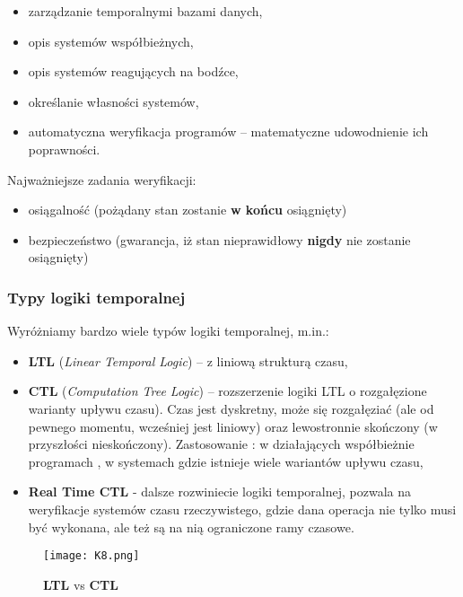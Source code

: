 \begin{itemize}
	\item zarządzanie temporalnymi bazami danych,
	\item opis systemów współbieżnych,
	\item opis systemów reagujących na bodźce,
	\item określanie własności systemów,
	\item automatyczna weryfikacja programów – matematyczne udowodnienie ich poprawności. \\
\end{itemize}

Najważniejsze zadania weryfikacji:

\begin{itemize}
	\item osiągalność (pożądany stan zostanie \textbf{w końcu} osiągnięty)
	\item bezpieczeństwo (gwarancja, iż stan nieprawidłowy \textbf{nigdy} nie zostanie osiągnięty)
\end{itemize}

\subsubsection{Typy logiki temporalnej}

Wyróżniamy bardzo wiele typów logiki temporalnej, m.in.:

\begin{itemize}
	\item \textbf{LTL} (\textit{Linear Temporal Logic}) – z liniową strukturą czasu,
	\item \textbf{CTL} (\textit{Computation Tree Logic}) – rozszerzenie logiki LTL o rozgałęzione warianty upływu czasu). Czas jest dyskretny, może się rozgałęziać (ale od pewnego momentu, wcześniej jest liniowy) oraz lewostronnie skończony (w przyszłości nieskończony). Zastosowanie : w działających współbieżnie programach , w systemach gdzie istnieje wiele wariantów upływu czasu,
	\item \textbf{Real Time CTL} - dalsze rozwiniecie logiki temporalnej, pozwala na weryfikacje systemów czasu rzeczywistego, gdzie dana operacja nie tylko musi być wykonana, ale też są na nią ograniczone ramy czasowe.
\end{itemize}

\begin{figure}[H]
	\centering
	\texttt{[image: K8.png]}
	\caption{\textbf{LTL} vs \textbf{CTL}}
\end{figure}

